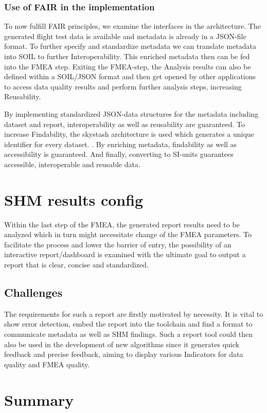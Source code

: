 
\subsubsection{Use of FAIR in the implementation}
To now fulfill FAIR principles, we examine the interfaces in the architecture. The generated flight test data is available and metadata is already in a JSON-file format. To further specify and standardize metadata we can translate metadata into SOIL to further Interoperability. This enriched metadata then can be fed into the FMEA step. Exiting the FMEA-step, the Analysis results can also be defined within a SOIL/JSON format and then get opened by other applications to access data quality results and perform further analysis steps, increasing Reusability.


By implementing standardized JSON-data structures for the metadata including dataset and report, interoperability as well as reusability are guaranteed. To increase Findability, the skystash architecture is used which generates a unique identifier for every dataset. \cite{meyer_development_2020}. By enriching metadata, findability as well as accessibility is guaranteed. And finally, converting to SI-units guarantees accessible, interoperable and reusable data.

\newpage


\section{SHM results config}

Within the last step of the FMEA, the generated report results need to be analyzed which in turn might necessitate change of the FMEA parameters. To facilitate the process and lower the barrier of entry, the possibility of an interactive report/dashboard is examined with the ultimate goal to output a report that is clear, concise and standardized.

\subsection{Challenges}

The requirements for such a report are firstly motivated by necessity. It is vital to show error detection, embed the report into the toolchain and find a format to communicate metadata as well as SHM findings. Such a report tool could then also be used in the development of new algorithms since it generates quick feedback and precise feedback, aiming to display various Indicators for data quality and FMEA quality.

\section{Summary}




